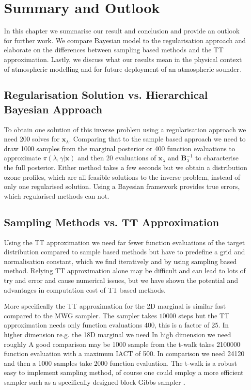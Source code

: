 \chapter{Summary and Outlook}
\label{ch:Concl}
In this chapter we summarise our result and conclusion and provide an outlook for further work.
We compare Bayesian model to the regularisation approach and elaborate on the differences between sampling based methods and the TT approximation.
Lastly, we discuss what our results mean in the physical context of atmospheric modelling and for future deployment of an atmospheric sounder.


\section{Regularisation Solution vs. Hierarchical Bayesian Approach}
To obtain one solution of this inverse problem using a regularisation approach we need 200 solves for $\bm{x}_{\lambda}$.
Comparing that to the sample based approach we need to draw 1000 samples from the marginal posterior or 400 function evaluations to approximate $\pi(\lambda, \gamma | \bm{x})$ and then 20 evaluations of $\bm{x}_{\lambda}$ and $\bm{B}^{-1}_{\lambda}$ to characterise the full posterior.
Either method takes a few seconds but we obtain a distribution ozone profiles, which are all feasible solutions to the inverse problem, instead of only one regularised solution.
Using a Bayesian framework provides true errors, which regularised methods can not.


\section{Sampling Methods vs. TT Approximation}
Using the TT approximation we need far fewer function evaluations of the target distribution compared to sample based methods but have to predefine a grid and normalisation constant, which we find iteratively and by using sampling based method.
Relying TT approximation alone may be difficult and can lead to lots of try and error and cause numerical issues, but we have shown the potential and advantages in computation cost of TT based methods.


More specifically the TT approximation for the 2D marginal is similar fast compared to the MWG sampler.
The sampler takes  $10000$ steps but the TT approximation needs only function evaluations $400$, this is a factor of 25.
In higher dimension re.g. the 18D marginal we need 
In high dimension we need roughly
A good comparison may be 1000 sample from the t-walk takes 2100000 function evaluation with a maximum IACT of 500.
In comparison we need  24120 and then a 1000 samples take 2000 function evaluation.
The t-walk is a robust easy to implement sampling method, of course one could employ a more efficient sampler such as a specifically designed block-Gibbs sampler \cite{}.

